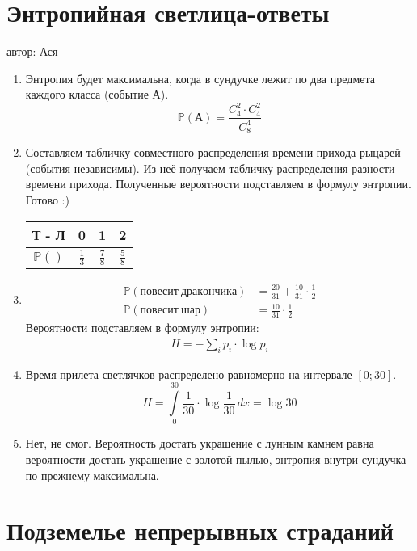 \documentclass[a4paper,12pt]{article}
\def \P{\mathbb{P}}
\begin{document}
\newpage
\section{Энтропийная светлица-ответы}
автор: Ася

\begin{enumerate}

\item Энтропия будет максимальна, когда в сундучке лежит по два предмета каждого класса (событие А).
\[\P(А) = \frac{C_{4}^{2}\cdot C_{4}^{2}}{C_{8}^{4}}\]

\item Составляем табличку совместного распределения времени прихода рыцарей (события независимы). Из неё получаем табличку распределения разности времени прихода. Полученные вероятности подставляем в формулу энтропии. Готово :)

\begin{center}
	\begin{tabular}{c|c|c|c}
    Т - Л & 0 & 1 & 2\\ \hline
    $\P()$ & $\frac{1}{3}$ & $\frac{7}{8}$ & $\frac{5}{8}$\\
    \bottomrule
	\end{tabular}
\end{center}
%
\item
\begin{align*}
\P(повесит\ дракончика) &=\frac{20}{31}+\frac{10}{31}\cdot\frac{1}{2} \\
\P(повесит\ шар) &=\frac{10}{31}\cdot\frac{1}{2}
\end{align*}
Вероятности подставляем в формулу энтропии:
\begin{align*}
H = -\sum_{i}{p_i\cdot\log{p_i}}
\end{align*}

\item Время прилета светлячков распределено равномерно на интервале $[0;30]$.\\
\[H = \int\limits_0^{30} \frac{1}{30}\cdot\log\frac{1}{30}\,dx = \log{30}\]

\item Нет, не смог. Вероятность достать украшение с лунным камнем равна вероятности достать украшение с золотой пылью, энтропия внутри сундучка по-прежнему максимальна.

\end{enumerate}


\newpage
\section{Подземелье непрерывных страданий} %
\end{document}
